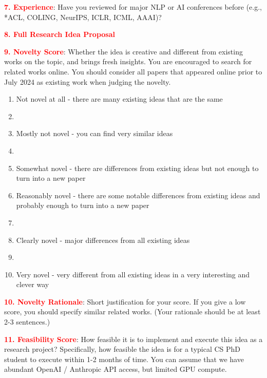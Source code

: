 \textbf{\textcolor{red}{7. Experience}}: Have you reviewed for major NLP or AI conferences before (e.g., *ACL, COLING, NeurIPS, ICLR, ICML, AAAI)? 

\textbf{\textcolor{red}{8. Full Research Idea Proposal}} 

\textbf{\textcolor{red}{9. Novelty Score}}: Whether the idea is creative and different from existing works on the topic, and brings fresh insights. You are encouraged to search for related works online. You should consider all papers that appeared online prior to July 2024 as existing work when judging the novelty.

\begin{enumerate}
    \item Not novel at all - there are many existing ideas that are the same
    \item 
    \item Mostly not novel - you can find very similar ideas
    \item 
    \item Somewhat novel - there are differences from existing ideas but not enough to turn into a new paper
    \item Reasonably novel - there are some notable differences from existing ideas and probably enough to turn into a new paper
    \item 
    \item Clearly novel - major differences from all existing ideas
    \item 
    \item Very novel - very different from all existing ideas in a very interesting and clever way
\end{enumerate}

\textbf{\textcolor{red}{10. Novelty Rationale}}: Short justification for your score. If you give a low score, you should specify similar related works. (Your rationale should be at least 2-3 sentences.)


\textbf{\textcolor{red}{11. Feasibility Score}}: How feasible it is to implement and execute this idea as a research project? Specifically, how feasible the idea is for a typical CS PhD student to execute within 1-2 months of time. You can assume that we have abundant OpenAI / Anthropic API access, but limited GPU compute.

